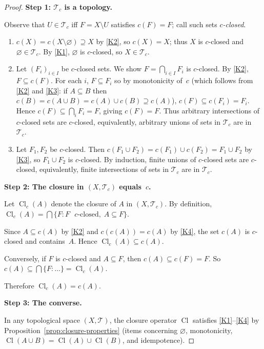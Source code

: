 \documentclass[11pt,a4paper,twoside]{book}
\theoremstyle{remark}
\theoremstyle{definition}
\theoremstyle{definition}
\newcommand{\Tau}{\mathcal{T}}           %
\DeclareMathOperator{\Cl}{Cl}
\begin{document}
\begin{proof}
\textbf{Step 1: $\Tau_c$ is a topology.}

Observe that $U\in\Tau_c$ iff $F=X\setminus U$ satisfies $c(F)=F$; call such
sets \emph{$c$-closed}.

\begin{enumerate}[label=(\roman*)]
  \item $c(X)=c(X\setminus\varnothing)\supseteq X$ by \ref{K2}, so
        $c(X)=X$; thus $X$ is $c$-closed and $\varnothing\in\Tau_c$.
        By \ref{K1}, $\varnothing$ is $c$-closed, so $X\in\Tau_c$.
  \item Let $(F_i)_{i\in I}$ be $c$-closed sets.  We show $F=\bigcap_{i\in I}F_i$
        is $c$-closed.  By \ref{K2}, $F\subseteq c(F)$.  For each $i$,
        $F\subseteq F_i$ so by monotonicity of~$c$
        (which follows from \ref{K2} and \ref{K3}: if $A\subseteq B$ then
        $c(B)=c(A\cup B)=c(A)\cup c(B)\supseteq c(A)$),
        $c(F)\subseteq c(F_i)=F_i$.  Hence $c(F)\subseteq\bigcap_i F_i=F$,
        giving $c(F)=F$.  Thus arbitrary intersections of $c$-closed sets
        are $c$-closed, equivalently, arbitrary unions of sets in $\Tau_c$
        are in~$\Tau_c$.
  \item Let $F_1,F_2$ be $c$-closed.  Then
        $c(F_1\cup F_2)=c(F_1)\cup c(F_2)=F_1\cup F_2$ by \ref{K3},
        so $F_1\cup F_2$ is $c$-closed.  By induction, finite unions of
        $c$-closed sets are $c$-closed, equivalently, finite intersections
        of sets in $\Tau_c$ are in $\Tau_c$.
\end{enumerate}

\textbf{Step 2: The closure in $(X,\Tau_c)$ equals~$c$.}

Let $\Cl_c(A)$ denote the closure of $A$ in $(X,\Tau_c)$.  By definition,
$\Cl_c(A)=\bigcap\{F:F\text{ $c$-closed},\;A\subseteq F\}$.

Since $A\subseteq c(A)$ by \ref{K2} and $c(c(A))=c(A)$ by \ref{K4}, the set
$c(A)$ is $c$-closed and contains~$A$.  Hence $\Cl_c(A)\subseteq c(A)$.

Conversely, if $F$ is $c$-closed and $A\subseteq F$, then
$c(A)\subseteq c(F)=F$.  So $c(A)\subseteq\bigcap\{F:\ldots\}=\Cl_c(A)$.

Therefore $\Cl_c(A)=c(A)$.

\textbf{Step 3: The converse.}

In any topological space $(X,\Tau)$, the closure operator $\Cl$ satisfies
\ref{K1}--\ref{K4} by Proposition~\ref{prop:closure-properties} (items
concerning $\varnothing$, monotonicity, $\Cl(A\cup B)=\Cl(A)\cup\Cl(B)$,
and idempotence).
\end{proof}
\end{document}
